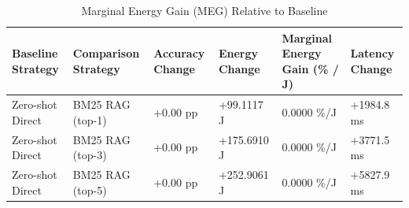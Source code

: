 \begin{table}
\caption{Marginal Energy Gain (MEG) Relative to Baseline}
\label{tab:marginal_energy_gain}
\begin{tabular}{llllll}
\toprule
Baseline Strategy & Comparison Strategy & Accuracy Change & Energy Change & Marginal Energy Gain (\% / J) & Latency Change \\
\midrule
Zero-shot Direct & BM25 RAG (top-1) & +0.00 pp & +99.1117 J & 0.0000 \%/J & +1984.8 ms \\
Zero-shot Direct & BM25 RAG (top-3) & +0.00 pp & +175.6910 J & 0.0000 \%/J & +3771.5 ms \\
Zero-shot Direct & BM25 RAG (top-5) & +0.00 pp & +252.9061 J & 0.0000 \%/J & +5827.9 ms \\
\bottomrule
\end{tabular}
\end{table}

